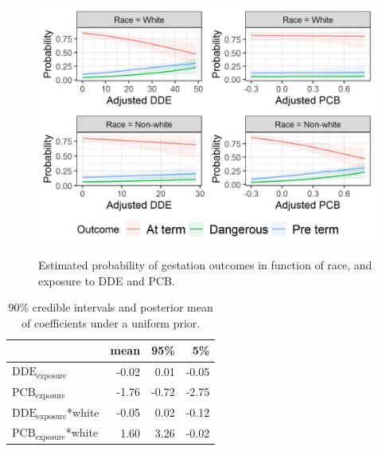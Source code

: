 \documentclass[10pt]{jmlr}%
\begin{document}
\begin{figure}[htbp]
	\centering
	\caption{Estimated probability of gestation outcomes in function of race, and exposure to DDE and PCB.}
	\includegraphics[width=0.7\linewidth]{results}
	\label{fig:results}
\end{figure}



\begin{table}
	\centering
	\label{tab:confints_unif}
	\begin{tabular}{lrrr}
		\toprule
		& mean & 95\% & 5\%\\
		\midrule
		$\text{DDE}_{\text{exposure}}$ & -0.02 & 0.01 & -0.05\\
		$\text{PCB}_{\text{exposure}}$ & -1.76 & -0.72 & -2.75\\
		$\text{DDE}_{\text{exposure}}$*white & -0.05 & 0.02 & -0.12\\
		$\text{PCB}_{\text{exposure}}$*white & 1.60 & 3.26 & -0.02\\
		\bottomrule
	\end{tabular}
	\caption{ 90\% credible intervals and posterior mean of coefficients under a uniform prior.}
\end{table}
\end{document}

